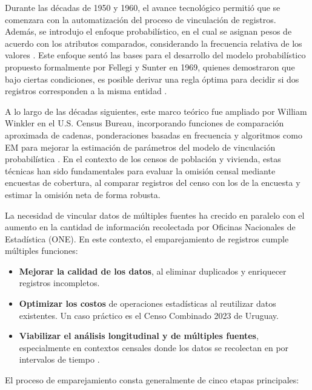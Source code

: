 \documentclass[
  12pt,
]{book}
\providecommand{\tightlist}{%
  \setlength{\itemsep}{0pt}\setlength{\parskip}{0pt}}
\begin{document}
Durante las décadas de 1950 y 1960, el avance tecnológico permitió que se comenzara con la automatización del proceso de vinculación de registros. Además, se introdujo el enfoque probabilístico, en el cual se asignan pesos de acuerdo con los atributos comparados, considerando la frecuencia relativa de los valores \citep[@newcombe1962]{newcombe1959}. Este enfoque sentó las bases para el desarrollo del modelo probabilístico propuesto formalmente por Fellegi y Sunter en 1969, quienes demostraron que bajo ciertas condiciones, es posible derivar una regla óptima para decidir si dos registros corresponden a la misma entidad \citep{fellegi1969theory}.

A lo largo de las décadas siguientes, este marco teórico fue ampliado por William Winkler en el U.S. Census Bureau, incorporando funciones de comparación aproximada de cadenas, ponderaciones basadas en frecuencia y algoritmos como EM para mejorar la estimación de parámetros del modelo de vinculación probabilística \citep[@winkler2006overview]{winkler1990}. En el contexto de los censos de población y vivienda, estas técnicas han sido fundamentales para evaluar la omisión censal mediante encuestas de cobertura, al comparar registros del censo con los de la encuesta y estimar la omisión neta de forma robusta.

La necesidad de vincular datos de múltiples fuentes ha crecido en paralelo con el aumento en la cantidad de información recolectada por Oficinas Nacionales de Estadística (ONE). En este contexto, el emparejamiento de registros cumple múltiples funciones:

\begin{itemize}
\tightlist
\item
  \textbf{Mejorar la calidad de los datos}, al eliminar duplicados y enriquecer registros incompletos.
\item
  \textbf{Optimizar los costos} de operaciones estadísticas al reutilizar datos existentes. Un caso práctico es el Censo Combinado 2023 de Uruguay.
\item
  \textbf{Viabilizar el análisis longitudinal y de múltiples fuentes}, especialmente en contextos censales donde los datos se recolectan en por intervalos de tiempo \citep{bleiholder2009data}.
\end{itemize}

El proceso de emparejamiento consta generalmente de cinco etapas principales:
\end{document}
